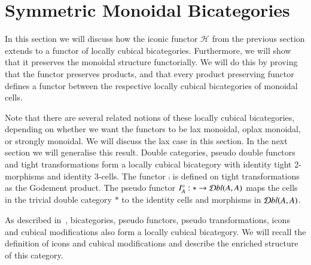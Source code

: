 \section{Symmetric Monoidal Bicategories}
\label{sec:constr-symm-mono}

In this section we will discuss how the iconic functor $\mathcal{H}$ from the previous section extends to a functor of locally cubical bicategories. Furthermore, we will show that it preserves the monoidal structure functorially. We will do this by proving that the functor preserves products, and that every product preserving functor defines a functor between the respective locally cubical bicategories of monoidal cells. 

Note that there are several related notions of these locally cubical bicategories, depending on whether we want the functors to be lax monoidal, oplax monoidal, or strongly monoidal. We will discuss the lax case in this section. In the next section we will generalise this result. 
Double categories, pseudo double functors and tight transformations form a locally cubical bicategory with identity tight 2-morphisms and identity 3-cells. The functor $\comp$ is defined on tight transformations as the Godement product. The pseudo functor $I^{\circ}_A: * \rightarrow \mathcal{D} bl(A,A)$ maps the cells in the trivial double category $*$ to the identity cells and morphisms in $\mathcal{D} bl(A,A)$. 

As described in~\cite{gg:ldstr-tricat}, bicategories, pseudo functors, pseudo transformations, icons and cubical modifications also form a locally cubical bicategory. We will recall the definition of icons and cubical modifications and describe the enriched structure of this category.

